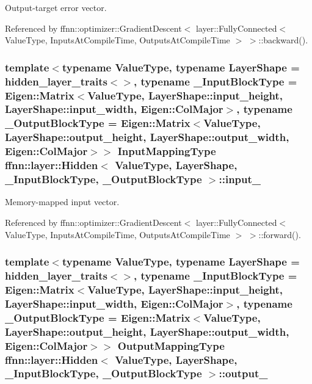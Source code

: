 Output-\/target error vector. 



Referenced by ffnn\-::optimizer\-::\-Gradient\-Descent$<$ layer\-::\-Fully\-Connected$<$ Value\-Type, Inputs\-At\-Compile\-Time, Outputs\-At\-Compile\-Time $>$ $>$\-::backward().

\hypertarget{classffnn_1_1layer_1_1_hidden_a1177e86b75ad7ba87aa4e855defa5851}{
\subsubsection[{input\-\_\-}]{\setlength{\rightskip}{0pt plus 5cm}template$<$typename Value\-Type, typename Layer\-Shape = hidden\-\_\-layer\-\_\-traits$<$$>$, typename \-\_\-\-Input\-Block\-Type = Eigen\-::\-Matrix$<$\-Value\-Type, Layer\-Shape\-::input\-\_\-height,  Layer\-Shape\-::input\-\_\-width,  Eigen\-::\-Col\-Major$>$, typename \-\_\-\-Output\-Block\-Type = Eigen\-::\-Matrix$<$\-Value\-Type, Layer\-Shape\-::output\-\_\-height, Layer\-Shape\-::output\-\_\-width, Eigen\-::\-Col\-Major$>$$>$ {\bf Input\-Mapping\-Type} {\bf ffnn\-::layer\-::\-Hidden}$<$ Value\-Type, Layer\-Shape, \-\_\-\-Input\-Block\-Type, \-\_\-\-Output\-Block\-Type $>$\-::input\-\_\-\hspace{0.3cm}{\ttfamily [protected]}}}\label{classffnn_1_1layer_1_1_hidden_a1177e86b75ad7ba87aa4e855defa5851}


Memory-\/mapped input vector. 



Referenced by ffnn\-::optimizer\-::\-Gradient\-Descent$<$ layer\-::\-Fully\-Connected$<$ Value\-Type, Inputs\-At\-Compile\-Time, Outputs\-At\-Compile\-Time $>$ $>$\-::forward().

\hypertarget{classffnn_1_1layer_1_1_hidden_adf9818c784dccc1860fe8384264cc4be}{
\subsubsection[{output\-\_\-}]{\setlength{\rightskip}{0pt plus 5cm}template$<$typename Value\-Type, typename Layer\-Shape = hidden\-\_\-layer\-\_\-traits$<$$>$, typename \-\_\-\-Input\-Block\-Type = Eigen\-::\-Matrix$<$\-Value\-Type, Layer\-Shape\-::input\-\_\-height,  Layer\-Shape\-::input\-\_\-width,  Eigen\-::\-Col\-Major$>$, typename \-\_\-\-Output\-Block\-Type = Eigen\-::\-Matrix$<$\-Value\-Type, Layer\-Shape\-::output\-\_\-height, Layer\-Shape\-::output\-\_\-width, Eigen\-::\-Col\-Major$>$$>$ {\bf Output\-Mapping\-Type} {\bf ffnn\-::layer\-::\-Hidden}$<$ Value\-Type, Layer\-Shape, \-\_\-\-Input\-Block\-Type, \-\_\-\-Output\-Block\-Type $>$\-::output\-\_\-\hspace{0.3cm}{\ttfamily [protected]}}}\label{classffnn_1_1layer_1_1_hidden_adf9818c784dccc1860fe8384264cc4be}


